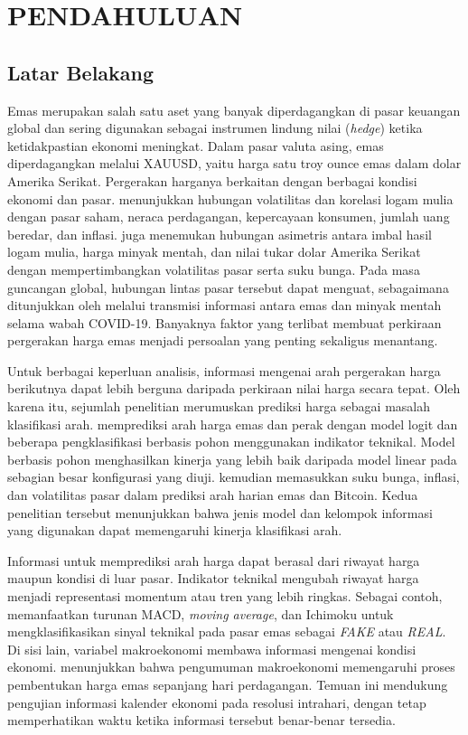 \chapter{PENDAHULUAN}

\section{Latar Belakang}
Emas merupakan salah satu aset yang banyak diperdagangkan di pasar keuangan global dan sering digunakan sebagai instrumen lindung nilai (\emph{hedge}) ketika ketidakpastian ekonomi meningkat. Dalam pasar valuta asing, emas diperdagangkan melalui XAUUSD, yaitu harga satu troy ounce emas dalam dolar Amerika Serikat. Pergerakan harganya berkaitan dengan berbagai kondisi ekonomi dan pasar. \textcite{dinh2022economic} menunjukkan hubungan volatilitas dan korelasi logam mulia dengan pasar saham, neraca perdagangan, kepercayaan konsumen, jumlah uang beredar, dan inflasi. \textcite{wang2023asymmetric} juga menemukan hubungan asimetris antara imbal hasil logam mulia, harga minyak mentah, dan nilai tukar dolar Amerika Serikat dengan mempertimbangkan volatilitas pasar serta suku bunga. Pada masa guncangan global, hubungan lintas pasar tersebut dapat menguat, sebagaimana ditunjukkan oleh \textcite{yousaf2022information} melalui transmisi informasi antara emas dan minyak mentah selama wabah COVID-19. Banyaknya faktor yang terlibat membuat perkiraan pergerakan harga emas menjadi persoalan yang penting sekaligus menantang.

Untuk berbagai keperluan analisis, informasi mengenai arah pergerakan harga berikutnya dapat lebih berguna daripada perkiraan nilai harga secara tepat. Oleh karena itu, sejumlah penelitian merumuskan prediksi harga sebagai masalah klasifikasi arah. \textcite{sadorsky2021predicting} memprediksi arah harga emas dan perak dengan model logit dan beberapa pengklasifikasi berbasis pohon menggunakan indikator teknikal. Model berbasis pohon menghasilkan kinerja yang lebih baik daripada model linear pada sebagian besar konfigurasi yang diuji. \textcite{basher2022forecasting} kemudian memasukkan suku bunga, inflasi, dan volatilitas pasar dalam prediksi arah harian emas dan Bitcoin. Kedua penelitian tersebut menunjukkan bahwa jenis model dan kelompok informasi yang digunakan dapat memengaruhi kinerja klasifikasi arah.

Informasi untuk memprediksi arah harga dapat berasal dari riwayat harga maupun kondisi di luar pasar. Indikator teknikal mengubah riwayat harga menjadi representasi momentum atau tren yang lebih ringkas. Sebagai contoh, \textcite{mamoudan2023hybrid} memanfaatkan turunan MACD, \emph{moving average}, dan Ichimoku untuk mengklasifikasikan sinyal teknikal pada pasar emas sebagai \emph{FAKE} atau \emph{REAL}. Di sisi lain, variabel makroekonomi membawa informasi mengenai kondisi ekonomi. \textcite{sobti2021how} menunjukkan bahwa pengumuman makroekonomi memengaruhi proses pembentukan harga emas sepanjang hari perdagangan. Temuan ini mendukung pengujian informasi kalender ekonomi pada resolusi intrahari, dengan tetap memperhatikan waktu ketika informasi tersebut benar-benar tersedia.

